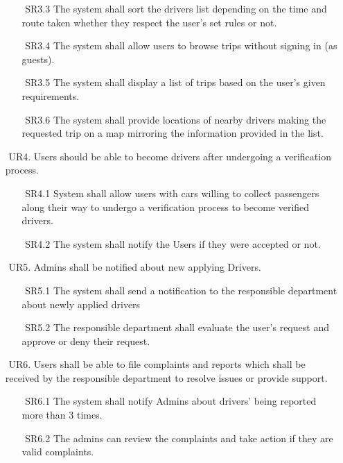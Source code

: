 \documentclass[a4paper, 12pt]{report} %
\begin{document}
\begin{itemize}
\begin{itemize}
                    \item [$ $] SR3.3 The system shall sort the drivers list depending on the time and route taken whether they respect the user’s set rules or not.
                    \item [$ $] SR3.4 The system shall allow users to browse trips without signing in (as guests).
                    \item [$ $] SR3.5 The system shall display a list of trips based on the user's given requirements.
                    \item [$ $] SR3.6 The system shall provide locations of nearby drivers making the requested trip on a map mirroring the information provided in the list. 
                \end{itemize}
               \item [$ $] UR4. Users should be able to become drivers after undergoing a verification process. 
               \begin{itemize}
                   \item [$ $] SR4.1 System shall allow users with cars willing to collect passengers along their way to undergo a verification process to become verified drivers.
                    \item [$ $] SR4.2 The system shall notify the Users if they were accepted or not.
               \end{itemize}            
                \item [$ $] UR5. Admins shall be notified about new applying Drivers.
                \begin{itemize}
                    \item [$ $] SR5.1 The system shall send a notification to the responsible department about newly applied drivers
                    \item [$ $] SR5.2 The responsible department shall evaluate the user’s request and approve or deny their request. 
                \end{itemize}
                \item [$ $] UR6. Users shall be able to file complaints and reports which shall be received by the responsible department to resolve issues or provide support.
                \begin{itemize}
                    \item [$ $] SR6.1 The system shall notify Admins about drivers’ being reported more than 3 times.
                    \item [$ $] SR6.2 The admins can review the complaints and take action if they are valid complaints.

\end{itemize}
\end{itemize}
\end{document}
